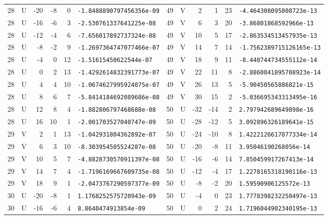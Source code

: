 \begin{longtable}{rcrrrl|rcrrrl}
28 & U & -20 & -8 & 0 & \texttt{-1.8488890797456356e-09} & 49 & V & 2 & 1 & 23 & \texttt{-4.464308095008723e-13}\\
28 & U & -16 & -6 & 3 & \texttt{-2.530761337641225e-08} & 49 & V & 6 & 3 & 20 & \texttt{-3.86801868592966e-13}\\
28 & U & -12 & -4 & 6 & \texttt{-7.656017892737324e-08} & 49 & V & 10 & 5 & 17 & \texttt{-2.863534513457935e-13}\\
28 & U & -8 & -2 & 9 & \texttt{-1.2697364747077466e-07} & 49 & V & 14 & 7 & 14 & \texttt{-1.7562389715126165e-13}\\
28 & U & -4 & 0 & 12 & \texttt{-1.51615450622544e-07} & 49 & V & 18 & 9 & 11 & \texttt{-8.440744734555112e-14}\\
28 & U & 0 & 2 & 13 & \texttt{-1.4292614832391773e-07} & 49 & V & 22 & 11 & 8 & \texttt{-2.8860041895708923e-14}\\
28 & U & 4 & 4 & 10 & \texttt{-1.0674627995924075e-07} & 49 & V & 26 & 13 & 5 & \texttt{-5.90450565886821e-15}\\
28 & U & 8 & 6 & 7 & \texttt{-5.8414184692089686e-08} & 49 & V & 30 & 15 & 2 & \texttt{-5.036695343313495e-16}\\
28 & U & 12 & 8 & 4 & \texttt{-1.882806797468688e-08} & 50 & U & -32 & -14 & 2 & \texttt{2.797942689649898e-16}\\
28 & U & 16 & 10 & 1 & \texttt{-2.001703527040747e-09} & 50 & U & -28 & -12 & 5 & \texttt{3.092896326189641e-15}\\
29 & V & 2 & 1 & 13 & \texttt{-1.042931804362892e-07} & 50 & U & -24 & -10 & 8 & \texttt{1.4222126617877334e-14}\\
29 & V & 6 & 3 & 10 & \texttt{-8.303954505524287e-08} & 50 & U & -20 & -8 & 11 & \texttt{3.95046190268056e-14}\\
29 & V & 10 & 5 & 7 & \texttt{-4.8828730570911397e-08} & 50 & U & -16 & -6 & 14 & \texttt{7.850459917267413e-14}\\
29 & V & 14 & 7 & 4 & \texttt{-1.7196169667609735e-08} & 50 & U & -12 & -4 & 17 & \texttt{1.2278165318190116e-13}\\
29 & V & 18 & 9 & 1 & \texttt{-2.0473767290597377e-09} & 50 & U & -8 & -2 & 20 & \texttt{1.59590906125572e-13}\\
30 & U & -20 & -8 & 1 & \texttt{1.1768252575720943e-09} & 50 & U & -4 & 0 & 23 & \texttt{1.7778398232250497e-13}\\
30 & U & -16 & -6 & 4 & \texttt{8.8640474913854e-09} & 50 & U & 0 & 2 & 24 & \texttt{1.7196044902340195e-13}\\

\end{longtable}
